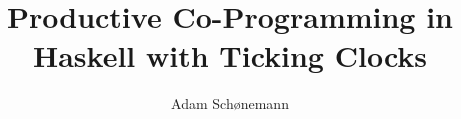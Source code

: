 \documentclass[sigplan,9pt,review]{acmart}\settopmatter{printfolios=true,printccs=false,printacmref=false}
\begin{document}
\sloppy

\title[Productive Co-Programming in Haskell]{Productive Co-Programming in Haskell with Ticking Clocks}         %



\author{Adam Schønemann}
\end{document}

